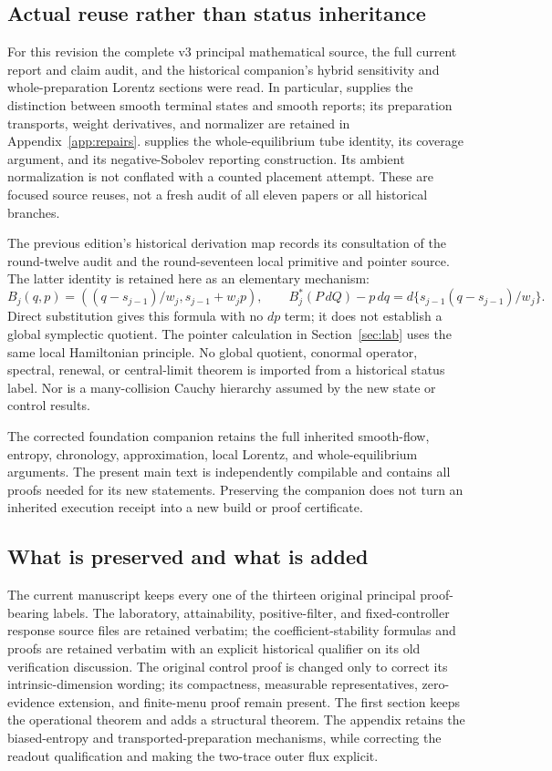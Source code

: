 \subsection{Actual reuse rather than status inheritance}
For this revision the complete v3 principal mathematical source, the full
current report and claim audit, and the historical companion's hybrid
sensitivity and whole-preparation Lorentz sections were read. In particular,
 supplies the distinction between
smooth terminal states and smooth reports; its preparation transports,
weight derivatives, and normalizer are retained in Appendix~\ref{app:repairs}.
 supplies the whole-equilibrium
tube identity, its coverage argument, and its negative-Sobolev reporting
construction. Its ambient normalization is not conflated with a counted
placement attempt. These are focused source reuses, not a fresh audit of
all eleven papers or all historical branches.

The previous edition's historical derivation map records its consultation
of the round-twelve audit and the round-seventeen local primitive and pointer
source. The latter identity is retained here as an elementary mechanism:
\[
 B_j(q,p)=((q-s_{j-1})/w_j,s_{j-1}+w_jp),\qquad
 B_j^*(P\,dQ)-p\,dq=d\{s_{j-1}(q-s_{j-1})/w_j\}.
\]
Direct substitution gives this formula with no $dp$ term; it does not
establish a global symplectic quotient. The pointer calculation in
Section~\ref{sec:lab} uses the same local Hamiltonian principle. No global
quotient, conormal operator, spectral, renewal, or central-limit theorem is
imported from a historical status label. Nor is a many-collision Cauchy
hierarchy assumed by the new state or control results.

The corrected foundation companion retains the full inherited smooth-flow,
entropy, chronology, approximation, local Lorentz, and whole-equilibrium
arguments. The present main text is independently compilable and contains
all proofs needed for its new statements. Preserving the companion does not
turn an inherited execution receipt into a new build or proof certificate.

\subsection{What is preserved and what is added}
The current manuscript keeps every one of the thirteen original principal
proof-bearing labels. The laboratory, attainability, positive-filter,
and fixed-controller response source files are retained verbatim; the
coefficient-stability formulas and proofs are retained verbatim with an
explicit historical qualifier on its old verification discussion. The original control proof is changed only to correct
its intrinsic-dimension wording; its compactness, measurable representatives,
zero-evidence extension, and finite-menu proof remain present. The first
section keeps the operational theorem and adds a structural theorem. The
appendix retains the biased-entropy and transported-preparation mechanisms,
while correcting the readout qualification and making the two-trace outer
flux explicit.

